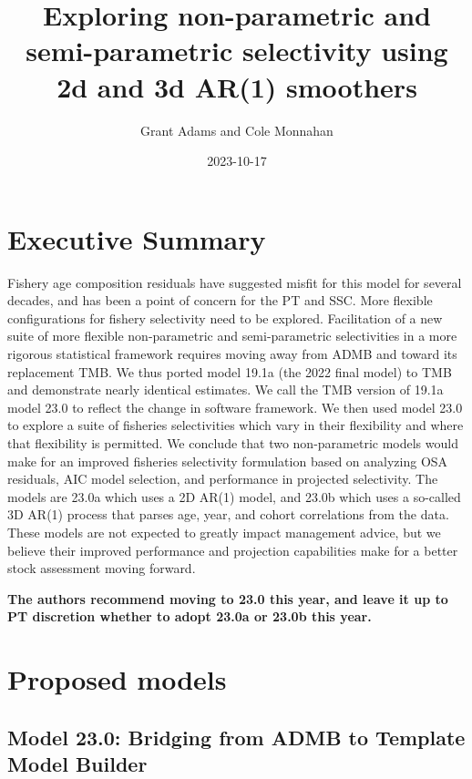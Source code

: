 \documentclass[
]{article}
\title{Exploring non-parametric and semi-parametric selectivity using 2d
and 3d AR(1) smoothers}
\author{Grant Adams and Cole Monnahan}
\date{2023-10-17}
\begin{document}
\maketitle

\hypertarget{executive-summary}{%
\section{Executive Summary}\label{executive-summary}}

Fishery age composition residuals have suggested misfit for this model
for several decades, and has been a point of concern for the PT and SSC.
More flexible configurations for fishery selectivity need to be
explored. Facilitation of a new suite of more flexible non-parametric
and semi-parametric selectivities in a more rigorous statistical
framework requires moving away from ADMB and toward its replacement TMB.
We thus ported model 19.1a (the 2022 final model) to TMB and demonstrate
nearly identical estimates. We call the TMB version of 19.1a model 23.0
to reflect the change in software framework. We then used model 23.0 to
explore a suite of fisheries selectivities which vary in their
flexibility and where that flexibility is permitted. We conclude that
two non-parametric models would make for an improved fisheries
selectivity formulation based on analyzing OSA residuals, AIC model
selection, and performance in projected selectivity. The models are
23.0a which uses a 2D AR(1) model, and 23.0b which uses a so-called 3D
AR(1) process that parses age, year, and cohort correlations from the
data. These models are not expected to greatly impact management advice,
but we believe their improved performance and projection capabilities
make for a better stock assessment moving forward.

\textbf{The authors recommend moving to 23.0 this year, and leave it up
to PT discretion whether to adopt 23.0a or 23.0b this year.}

\hypertarget{proposed-models}{%
\section{Proposed models}\label{proposed-models}}

\hypertarget{model-23.0-bridging-from-admb-to-template-model-builder}{%
\subsection{Model 23.0: Bridging from ADMB to Template Model
Builder}\label{model-23.0-bridging-from-admb-to-template-model-builder}}
\end{document}
